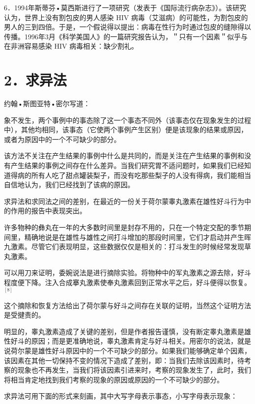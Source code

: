 6．1994年斯蒂芬•莫西斯进行了一项研究（发表于《国际流行病杂志》）。该研究认为，世界上没有割包皮的男人感染 HIV 病毒（艾滋病）的可能性，为割包皮的男人的三到四倍。于是，一个假说得以提出：病毒在性行为时通过包皮的缝隙得以传播。1996年3月《科学美国人》的一篇研究报告认为，＂只有一个因素＂似乎与在非洲容易感染 HIV 病毒相关：缺少割礼。

\section*{2．求异法}
约翰•斯图亚特•密尔写道：

象不发生，两个事例中的事态除了这一个事态不同外（该事态仅在现象发生的过程中），其他均相同，该事态（它使两个事例产生区别）便是该现象的结果或原因，或者为原因中的一个不可缺少的部分。

该方法不关注在产生结果的事例中什么是共同的，而是关注在产生结果的事例和没有产生结果的事例之间存在什么差异。当我们研究胃不适问题时，如果我们已经知道得病的所有人吃了甜点罐装梨子，而没有吃那些梨子的人没有得病，我们能相当自信地认为，我们已经找到了该病的原因。

求异法和求同法之间的差别，在最近的一份关于荷尔蒙睾丸激素在雄性好斗行为中的作用的报告中表现突出。

许多物种的彝丸在一年的大多数时间里是封存不用的，只在一个特定交配的季节期间里，精确地说是在雄性与雄性之间打斗增加的那段时间里，它们才启动并产生晖九激素。尽管它们表现明显，这些数据仅仅是相关的：打斗发生的时候经常发现草丸激素。

可以用刀来证明，委婉说法是进行摘除实验。将物种中的军丸激素之源去除，好斗程度便下降。注入合成搴丸激素使奉丸激素回到正常水平之后，好斗便得以恢复。 ${ }^{[8]}$

这个摘除和恢复方法给出了荷尔蒙与好斗之间存在关联的证明，当然这个证明方法是受揵责的。

明显的，睾丸激素造成了关键的差别，但是作者报告谨慎，没有断定睾丸激素是雄性好斗的原因；而是更准确地说，睾丸激素肯定与好斗相关。用密尔的说法，就是说荷尔蒙是雄性好斗原因中的一个不可缺少的部分。如果我们能够确定单个因素，该因素在其他一切保持不变的情况下造成了差别，即：当我们去除该因素时，待考察的现象也不再发生，当我们将该因素引进来时，考察的现象发生了，此时，我们将相当肯定地找到我们考察的现象的原因或原因的一个不可缺少的部分。

求异法可用下面的形式来刻画，其中大写字母表示事态，小写字母表示现象：


